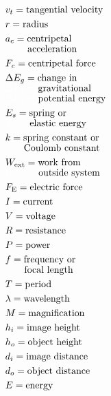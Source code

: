 \documentclass[dvipsnames]{article}
\begin{document}
\begin{multicols*}{4}
\begin{align*}
    & v_t = \text{tangential velocity} \\
    & r = \text{radius} \\
    & a_c = \text{centripetal} \\[-1ex]
    & \textcolor{white}{a_c =} \text{ acceleration} \\
    & F_c = \text{centripetal force} \\
    & \Delta E_g = \text{change in} \\[-1ex]
    & \textcolor{white}{\Delta E_g =} \text{ gravitational} \\[-1ex]
    & \textcolor{white}{\Delta E_g =} \text{ potential energy} \\
    & E_s = \text{spring or} \\[-1ex]
    & \textcolor{white}{E_s =} \text{ elastic energy} \\
    & k = \text{spring constant or} \\[-1ex]
    & \textcolor{white}{k =} \text{ Coulomb constant} \\
    & W_\mathrm{ext} = \text{work from} \\[-1ex]
    & \textcolor{white}{W_\mathrm{ext} =} \text{ outside system} \\
    & F_\mathrm{E} = \text{electric force} \\
    & I = \text{current} \\
    & V = \text{voltage} \\
    & R = \text{resistance} \\
    & P = \text{power} \\
    & f = \text{frequency or} \\[-1ex]
    & \textcolor{white}{f =} \text{ focal length} \\
    & T = \text{period} \\
    & \lambda = \text{wavelength} \\
    & M = \text{magnification} \\
    & h_i = \text{image height} \\
    & h_o = \text{object height} \\
    & d_i = \text{image distance} \\
    & d_o = \text{object distance} \\
    & E = \text{energy}
\end{align*}
\end{multicols*}

\clearpage






\printnoidxglossaries
\end{document}
